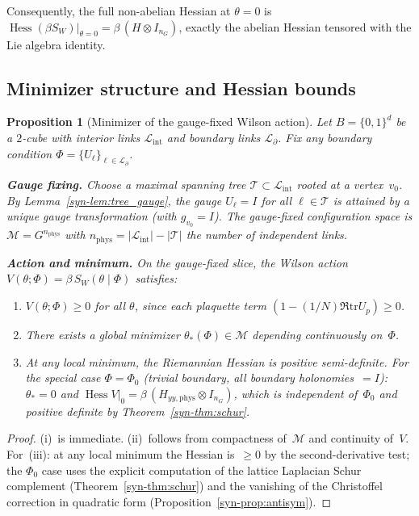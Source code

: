 \documentclass[11pt]{article}
\newtheorem{proposition}[theorem]{Proposition}
\theoremstyle{definition}
\newcommand{\tr}{\mathrm{tr}}
\newcommand{\Hess}{\operatorname{Hess}}
\begin{document}
\noindent Consequently, the full non-abelian Hessian at $\theta = 0$ is
$\Hess(\beta S_W)|_{\theta=0} = \beta\,(H \otimes I_{n_G})$,
exactly the abelian Hessian tensored with the Lie algebra identity.

\subsection{Minimizer structure and Hessian bounds}

\begin{proposition}[Minimizer of the gauge-fixed Wilson action]
\label{syn-prop:unique_min}
Let $B = \{0,1\}^d$ be a $2$-cube with interior links
$\mathcal{L}_{\mathrm{int}}$ and boundary links
$\mathcal{L}_{\partial}$.  Fix any boundary
condition $\Phi = \{U_\ell\}_{\ell \in \mathcal{L}_\partial}$.

\textbf{Gauge fixing.}
Choose a maximal spanning tree
$\mathcal{T} \subset \mathcal{L}_{\mathrm{int}}$
rooted at a vertex~$v_0$.
By Lemma~\ref{syn-lem:tree_gauge}, the gauge
$U_\ell = I$ for all $\ell \in \mathcal{T}$
is attained by a unique gauge transformation
(with $g_{v_0} = I$).  The gauge-fixed
configuration space
is $\mathcal{M} = G^{n_{\mathrm{phys}}}$ with
$n_{\mathrm{phys}} = |\mathcal{L}_{\mathrm{int}}|
- |\mathcal{T}|$ the number of independent links.

\textbf{Action and minimum.}
On the gauge-fixed slice, the Wilson action
$V(\theta; \Phi) = \beta\,S_W(\theta \mid \Phi)$
satisfies:
\begin{enumerate}[label=\textup{(\roman*)},nosep]
  \item $V(\theta; \Phi) \geq 0$ for all $\theta$,
    since each plaquette term
    $(1 - (1/N)\Re\tr U_p) \geq 0$.
  \item There exists a global minimizer
    $\theta_*(\Phi) \in \mathcal{M}$ depending
    continuously on~$\Phi$.
  \item At any local minimum, the Riemannian Hessian
    is positive semi-definite.  For the special case
    $\Phi = \Phi_0$ \textup{(}trivial boundary,
    all boundary holonomies~$= I$\textup{)}:
    $\theta_* = 0$ and $\Hess V|_0 =
    \beta\,(H_{yy,\mathrm{phys}} \otimes I_{n_G})$,
    which is independent of~$\Phi_0$ and positive
    definite by Theorem~\ref{syn-thm:schur}.
\end{enumerate}
\end{proposition}

\begin{proof}
(i)~is immediate.  (ii)~follows from compactness
of~$\mathcal{M}$ and continuity of~$V$.  For~(iii):
at any local minimum the Hessian is~$\geq 0$ by the
second-derivative test; the $\Phi_0$ case uses the
explicit computation of the lattice Laplacian Schur
complement (Theorem~\ref{syn-thm:schur}) and the vanishing
of the Christoffel correction in quadratic form
(Proposition~\ref{syn-prop:antisym}).
\end{proof}
\end{document}
